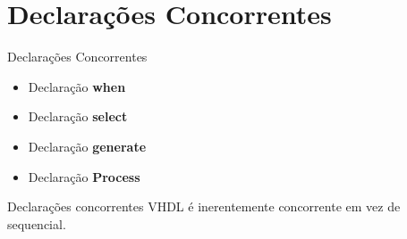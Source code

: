 \documentclass[aspectratio=169]{beamer}
\begin{document}
\section{Declarações Concorrentes}
\begin{frame}{Declarações Concorrentes}
	\justifying
	
	\begin{itemize}
		\item Declaração \textbf{when}
		\item Declaração \textbf{select}
		\item Declaração \textbf{generate}
		\item Declaração \textbf{Process}
	\end{itemize}
	
	
	\begin{block}{Declarações concorrentes}
	VHDL é inerentemente concorrente em vez de sequencial.	
		
	\end{block}
	
	
\end{frame}
\end{document}
